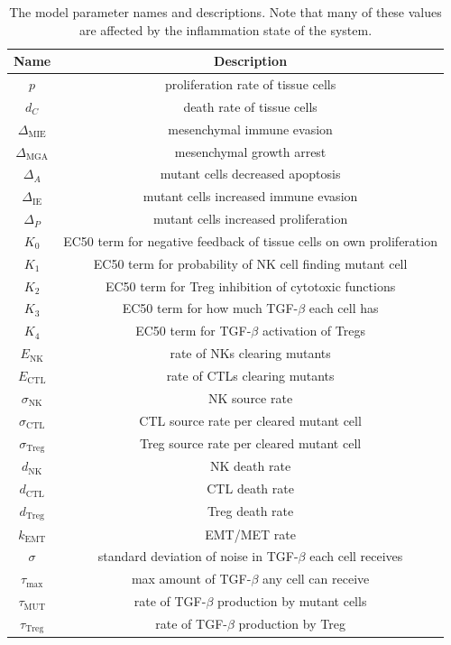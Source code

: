 \documentclass[11pt, a4paper, preprint]{article}
\begin{document}
\begin{table}[H]
\begin{center}
 \begin{tabular}{| c | c|} 
 \hline
 Name & Description  \\ [0.5ex] 
 \hline
 $p$ & proliferation rate of tissue cells \\ 
 \hline
 $d_C$  & death rate of tissue cells \\
 \hline
$\Delta_\text{MIE}$ &  mesenchymal immune evasion \\
 \hline
 $\Delta_\text{MGA}$ & mesenchymal growth arrest    \\
 \hline
  $\Delta_A$ & mutant cells decreased apoptosis  \\
  \hline
  $\Delta_\text{IE}$ & mutant cells increased immune evasion  \\
  \hline
  $\Delta_P$ & mutant cells increased proliferation  \\
  \hline
 $K_0$ & EC50 term for negative feedback of tissue cells on own proliferation\\
 \hline
 $K_1$ & EC50 term for probability of NK cell finding mutant cell\\
 \hline
  $K_2$ & EC50 term for Treg inhibition of cytotoxic functions  \\
  \hline
  $K_3$ & EC50 term for how much TGF-$\beta$ each cell has \\
  \hline
  $K_4$ & EC50 term for TGF-$\beta$ activation of Tregs \\
  \hline
 $E_\text{NK}$ & rate of NKs clearing mutants  \\
  \hline
  $E_\text{CTL}$ & rate of CTLs clearing mutants \\
  \hline
  $\sigma_\text{NK}$ & NK source rate \\ 
  \hline
  $\sigma_\text{CTL}$ & CTL source rate per cleared mutant cell \\ 
  \hline
  $\sigma_\text{Treg}$ & Treg source rate per cleared mutant cell \\ 
  \hline
  $d_\text{NK}$ & NK death rate  \\ 
  \hline
  $d_\text{CTL}$ & CTL death rate \\ 
  \hline
  $d_\text{Treg}$ & Treg death rate \\ 
  \hline
  $k_\text{EMT}$ & EMT/MET rate  \\
  \hline
  $\sigma$ & standard deviation of noise in TGF-$\beta$ each cell receives  \\
  \hline
 $\tau_\text{max}$ & max amount of TGF-$\beta$ any cell can receive \\
  \hline 
 $\tau_\text{MUT}$ & rate of TGF-$\beta$ production by mutant cells\\
  \hline
 $\tau_\text{Treg}$ & rate of TGF-$\beta$ production by Treg\\
  \hline
\end{tabular}
  \caption{The model parameter names and descriptions. Note that many of these values are affected by the inflammation state of the system.}
\end{center}
\end{table}
\end{document}
